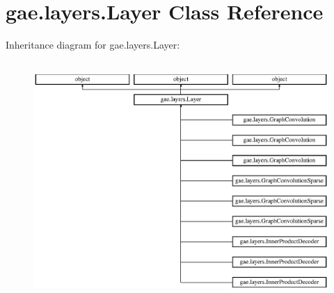 \hypertarget{classgae_1_1layers_1_1Layer}{}\section{gae.\+layers.\+Layer Class Reference}
\label{classgae_1_1layers_1_1Layer}
Inheritance diagram for gae.\+layers.\+Layer\+:\begin{figure}[H]
\begin{center}
\leavevmode
\includegraphics[height=9.085546cm]{classgae_1_1layers_1_1Layer}
\end{center}
\end{figure}
